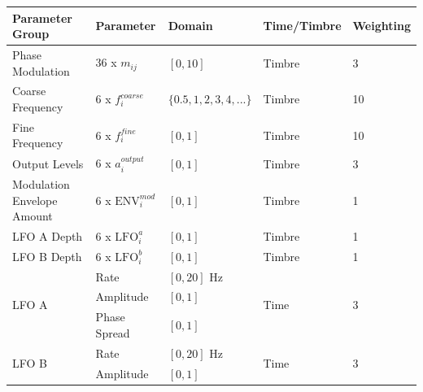 \documentclass[11pt, oneside]{report}   	%
\begin{document}
\def\arraystretch{1.5}
\begin{table}[]
	\hspace{-2em}
	\begin{tabular}{|l|l|l|l|l|}
		\hline
		\textbf{Parameter Group}                	 & \textbf{Parameter}     & \textbf{Domain}            & \textbf{Time/Timbre} & \textbf{Weighting} \\ \hline
		Phase Modulation         						& 36 x $m_{ij}$               & $[0, 10]$                  		& Timbre                	& 3									\\ \hline
		Coarse Frequency                            	& 6 x $f_{i}^{coarse}$     & $\{0.5, 1, 2, 3, 4, ...\}$ & Timbre                	& 10									  \\ \hline
		Fine Frequency                                 	   & 6 x $f_{i}^{fine}$         & $[0, 1]$                   		& Timbre                	& 10									  \\ \hline
		Output Levels                                  		& 6 x $a_{i}^{output}$     & $[0, 1]$                   	  & Timbre                	& 3								    	\\ \hline
Modulation Envelope Amount                       & 6 x $\mathrm{ENV}_{i}^{mod}$   & $[0, 1]$                   	     & Timbre                  & 1		  \\ \hline
		LFO A Depth                                    		& 6 x $\mathrm{LFO}_{i}^{a}$         & $[0, 1]$                   	   & Timbre                  & 1				\\ \hline
		LFO B Depth                                    		& 6 x $\mathrm{LFO}_{i}^{b}$        & $[0, 1]$                   	   & Timbre                  & 1				\\ \hline
		\multirow{3}{*}{LFO A}      					& Rate                    		& $[0, 20]$ Hz               	 & \multirow{3}{*}{Time}& \multirow{3}{*}{3} \\
																	  & Amplitude               	& $[0, 1]$                   		&                      				& \\
																	  & Phase Spread         	& $[0, 1]$                   		&                       			&\\ \hline
		\multirow{3}{*}{LFO B}      					& Rate                    		& $[0, 20]$ Hz               	& \multirow{3}{*}{Time}& \multirow{3}{*}{3} \\
																	  & Amplitude               	& $[0, 1]$                   		&                       			&\\

\end{tabular}
\end{table}
\end{document}
